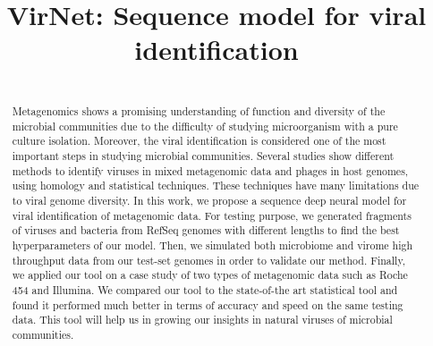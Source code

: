 \documentclass[conference]{IEEEtran}
\begin{document}
\title{\LARGE \bf VirNet: Sequence model for viral identification}

\author{

	\and
	\and
	\and
	\and
}



\maketitle

\begin{abstract}\\Metagenomics shows a promising understanding of function and diversity of the microbial communities due to the difficulty of studying microorganism with a pure culture isolation. Moreover, the viral identification is considered one of the most important steps in studying microbial communities. Several studies show different methods to identify viruses in mixed metagenomic data and phages in host genomes, using homology and statistical techniques. These techniques have many limitations due to viral genome diversity. In this work, we propose a sequence deep neural model for viral identification of metagenomic data. For testing purpose, we generated fragments of viruses and bacteria from RefSeq genomes with different lengths to find the best hyperparameters of our model. Then, we simulated both microbiome and virome high throughput data from our test-set genomes in order to validate our method. Finally, we applied our tool on a case study of two types of metagenomic data such as Roche 454 and Illumina. We compared our tool to the state-of-the art statistical tool and found it performed much better in terms of accuracy and speed on the same testing data. This tool will help us in growing our insights in natural viruses of microbial communities.
\end{abstract}
\end{document}
